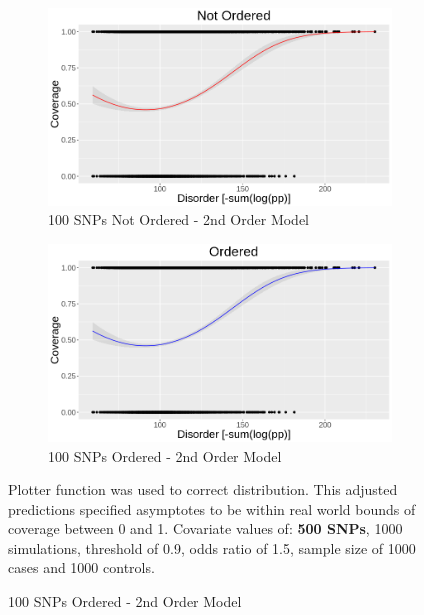 \begin{figure}[H]
    \begin{centering}
    \caption{Coverage and Disorder in 100 SNPs}
    \begin{subfigure}[H]{\textwidth}
        \centering
        \includegraphics[width=\textwidth]{images/Coverage_and_Disorder_Charts/NotOrd_Cov_100SNPs.png}
        \caption{100 SNPs Not Ordered - 2nd Order Model}
        \label{}
    \end{subfigure}
    \hfill
    
    
    \begin{subfigure}[H]{\textwidth}
        \centering
        \includegraphics[width=\textwidth]{images/Coverage_and_Disorder_Charts/Ord_Cov_100SNPs.png}
        \caption{100 SNPs Ordered - 2nd Order Model}
        \label{}
    \end{subfigure}
    \label{}
\footnotesize
Plotter function was used to correct distribution. This adjusted predictions specified asymptotes to be within real world bounds of coverage between 0 and 1. Covariate values of: \textbf{500 SNPs}, 1000 simulations, threshold of 0.9, odds ratio of 1.5, sample size of 1000 cases and 1000 controls.
\end{centering}
\end{figure}


